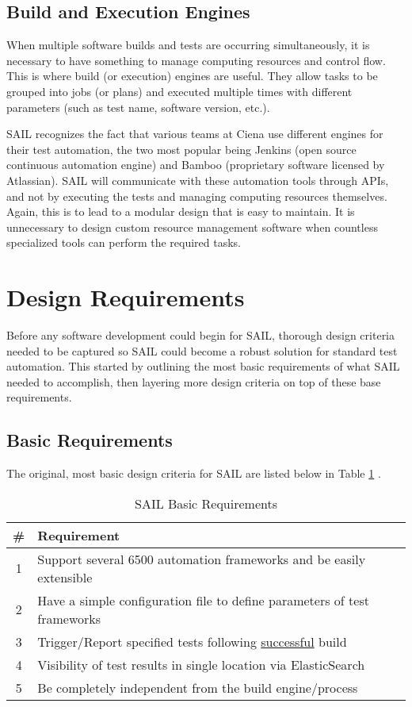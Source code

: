 \documentclass[10pt, titlepage, onecolumn, openany]{article}
\begin{document}
\subsection{Build and Execution Engines}
When multiple software builds and tests are occurring simultaneously, it is
necessary to have something to manage computing resources and control flow.
This is where build (or execution) engines are useful. They allow tasks to be grouped into
jobs (or plans) and executed multiple times with different parameters (such as test name,
software version, etc.).

SAIL recognizes the fact that various teams at Ciena use different engines for
their test automation, the two most popular being Jenkins (open source continuous
automation engine) and Bamboo (proprietary software licensed by Atlassian). SAIL will
communicate with these automation tools through APIs, and not by executing the tests and
managing computing resources themselves. Again, this is to lead to a modular design that is easy
to maintain. It is unnecessary to design custom resource management software when countless
specialized tools can perform the required tasks.


\clearpage
\section{Design Requirements}
Before any software development could begin for SAIL, thorough design criteria
needed to be captured so SAIL could become a robust solution for standard test automation.
This started by outlining the most basic requirements of what SAIL needed to accomplish,
then layering more design criteria on top of these base requirements.
\subsection{Basic Requirements}
The original, most basic design criteria for SAIL are listed below in Table
\ref{tab:basicTable} \cite{sailDesignOrig}.
\begin{table}[h]
\caption{SAIL Basic Requirements}
\centering
\begin{tabular}{|c|l|}
    \hline
    \# & Requirement \\
    \hline
    1 & Support several 6500 automation frameworks and be easily extensible \\
    \hline
    2 & Have a simple configuration file to define parameters of test frameworks \\
    \hline
    3 & Trigger/Report specified tests following \underline{successful} build \\
    \hline
    4 & Visibility of test results in single location via ElasticSearch \\
    \hline
    5 & Be completely independent from the build engine/process \\
    \hline
\end{tabular}
\label{tab:basicTable}
\end{table}
\end{document}
